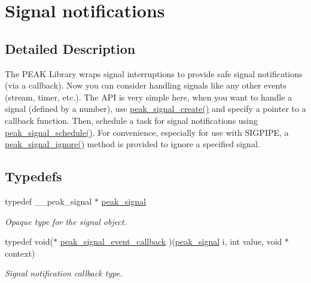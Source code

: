 \hypertarget{group__signal}{
\section{Signal notifications}
\label{group__signal}
}


\subsection{Detailed Description}
The PEAK Library wraps signal interruptions to provide safe signal notifications (via a callback). Now you can consider handling signals like any other events (stream, timer, etc.). The API is very simple here, when you want to handle a signal (defined by a number), use \hyperlink{group__signal_ga5}{peak\_\-signal\_\-create()} and specify a pointer to a callback function. Then, schedule a task for signal notifications using \hyperlink{group__signal_ga6}{peak\_\-signal\_\-schedule()}. For convenience, especially for use with SIGPIPE, a \hyperlink{group__signal_ga8}{peak\_\-signal\_\-ignore()} method is provided to ignore a specified signal. 

\subsection*{Typedefs}
\begin{CompactItemize}
\item 
\hypertarget{group__signal_ga0}{
typedef \_\-\_\-peak\_\-signal $\ast$ \hyperlink{group__signal_ga0}{peak\_\-signal}}
\label{group__signal_ga0}

\begin{CompactList}\small\item\em Opaque type for the signal object. \item\end{CompactList}\item 
\hypertarget{group__signal_ga1}{
typedef void($\ast$ \hyperlink{group__signal_ga1}{peak\_\-signal\_\-event\_\-callback} )(\hyperlink{group__signal_ga0}{peak\_\-signal} i, int value, void $\ast$context)}
\label{group__signal_ga1}

\begin{CompactList}\small\item\em Signal notification callback type. \item\end{CompactList}\end{CompactItemize}
